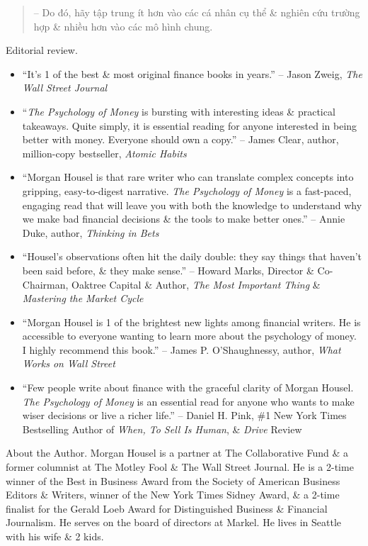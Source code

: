 \documentclass{article}
\begin{document}
\begin{enumerate}
\begin{quotation}
		-- Do đó, hãy tập trung ít hơn vào các cá nhân cụ thể \& nghiên cứu trường hợp \& nhiều hơn vào các mô hình chung.
	\end{quotation}
	{\sf Editorial review.}
	\begin{itemize}
		\item ``It's 1 of the best \& most original finance books in years.'' -- {\sc Jason Zweig}, {\it The Wall Street Journal}
		\item ``{\it The Psychology of Money} is bursting with interesting ideas \& practical takeaways. Quite simply, it is essential reading for anyone interested in being better with money. Everyone should own a copy.'' -- {\sc James Clear}, author, million-copy bestseller, {\it Atomic Habits}
		\item ``{\sc Morgan Housel} is that rare writer who can translate complex concepts into gripping, easy-to-digest narrative. {\it The Psychology of Money} is a fast-paced, engaging read that will leave you with both the knowledge to understand why we make bad financial decisions \& the tools to make better ones.'' -- {\sc Annie Duke}, author, {\it Thinking in Bets}
		\item ``{\sc Housel}'s observations often hit the daily double: they say things that haven't been said before, \& they make sense.'' -- {\sc Howard Marks}, Director \& Co-Chairman, Oaktree Capital \& Author, {\it The Most Important Thing} \& {\it Mastering the Market Cycle}
		\item ``{\sc Morgan Housel} is 1 of the brightest new lights among financial writers. He is accessible to everyone wanting to learn more about the psychology of money. I highly recommend this book.'' -- {\sc James P. O'Shaughnessy}, author, {\it What Works on Wall Street}
		\item ``Few people write about finance with the graceful clarity of {\sc Morgan Housel}. {\it The Psychology of Money} is an essential read for anyone who wants to make wiser decisions or live a richer life.'' -- {\sc Daniel H. Pink}, \#1 New York Times Bestselling Author of {\it When, To Sell Is Human}, \& {\it Drive} Review
	\end{itemize}
	{\sf About the Author.} {\sc Morgan Housel} is a partner at The Collaborative Fund \& a former columnist at The Motley Fool \& The Wall Street Journal. He is a 2-time winner of the Best in Business Award from the Society of American Business Editors \& Writers, winner of the New York Times Sidney Award, \& a 2-time finalist for the Gerald Loeb Award for Distinguished Business \& Financial Journalism. He serves on the board of directors at Markel. He lives in Seattle with his wife \& 2 kids.


\end{enumerate}
\end{document}
